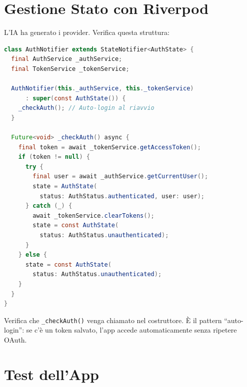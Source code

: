 \section{Gestione Stato con Riverpod}

L'IA ha generato i provider. Verifica questa struttura:

\begin{lstlisting}[language=Java,title={Pattern AuthNotifier con Riverpod}]
class AuthNotifier extends StateNotifier<AuthState> {
  final AuthService _authService;
  final TokenService _tokenService;

  AuthNotifier(this._authService, this._tokenService)
      : super(const AuthState()) {
    _checkAuth(); // Auto-login al riavvio
  }

  Future<void> _checkAuth() async {
    final token = await _tokenService.getAccessToken();
    if (token != null) {
      try {
        final user = await _authService.getCurrentUser();
        state = AuthState(
          status: AuthStatus.authenticated, user: user);
      } catch (_) {
        await _tokenService.clearTokens();
        state = const AuthState(
          status: AuthStatus.unauthenticated);
      }
    } else {
      state = const AuthState(
        status: AuthStatus.unauthenticated);
    }
  }
}
\end{lstlisting}

\begin{tipbox}
Verifica che \texttt{\_checkAuth()} venga chiamato nel costruttore. È il pattern ``auto-login'': se c'è un token salvato, l'app accede automaticamente senza ripetere OAuth.
\end{tipbox}

\section{Test dell'App}

